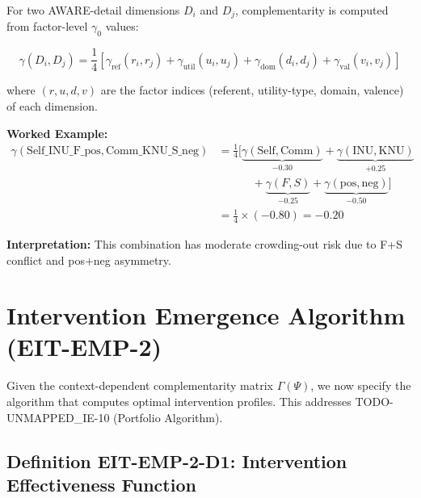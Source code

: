 \begin{tcolorbox}[colback=green!5!white, colframe=green!75!black,
    title=\textbf{Algorithm EIT-EMP-1-A1: Detail Gamma Computation}]

For two AWARE-detail dimensions $D_i$ and $D_j$, complementarity is computed from factor-level $\gamma_0$ values:

\begin{equation}
\gamma(D_i, D_j) = \frac{1}{4} \left[ \gamma_{\text{ref}}(r_i, r_j) + \gamma_{\text{util}}(u_i, u_j) + \gamma_{\text{dom}}(d_i, d_j) + \gamma_{\text{val}}(v_i, v_j) \right]
\end{equation}

where $(r, u, d, v)$ are the factor indices (referent, utility-type, domain, valence) of each dimension.

\textbf{Worked Example:}
\begin{align*}
\gamma(\text{Self\_INU\_F\_pos}, \text{Comm\_KNU\_S\_neg}) &= \frac{1}{4} \Big[ \underbrace{\gamma(\text{Self}, \text{Comm})}_{-0.30} + \underbrace{\gamma(\text{INU}, \text{KNU})}_{+0.25} \\
&\qquad\quad + \underbrace{\gamma(F, S)}_{-0.25} + \underbrace{\gamma(\text{pos}, \text{neg})}_{-0.50} \Big] \\
&= \frac{1}{4} \times (-0.80) = -0.20
\end{align*}

\textbf{Interpretation:} This combination has moderate crowding-out risk due to F+S conflict and pos+neg asymmetry.

\end{tcolorbox}

\section{Intervention Emergence Algorithm (EIT-EMP-2)}
\label{sec:ie-emerge-algorithm}

Given the context-dependent complementarity matrix $\Gamma(\Psi)$, we now specify the algorithm that computes optimal intervention profiles. This addresses TODO-UNMAPPED_IE-10 (Portfolio Algorithm).

\subsection{Definition EIT-EMP-2-D1: Intervention Effectiveness Function}
\label{subsec:effectiveness-function}


